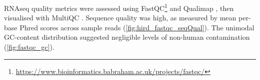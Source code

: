 
\gls{RNAseq} quality metrics were assessed using FastQC\footnote{\url{https://www.bioinformatics.babraham.ac.uk/projects/fastqc/}} and Qualimap \autocite{okonechnikov2015QualimapAdvancedMultisample}, then visualised with MultiQC \autocite{ewels2016MultiQCSummarizeAnalysis}.
Sequence quality was high, as measured by mean per-base Phred scores across sample reads (\cref{fig:hird_fastqc_seqQual}).
The unimodal GC-content distribution suggested negligible levels of non-human contamination (\cref{fig:fastqc_gc}).

